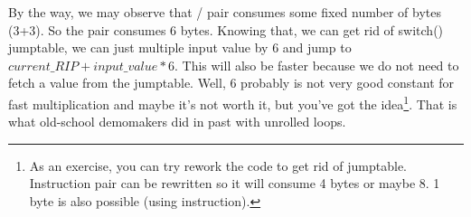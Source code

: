 By the way, we may observe that / pair consumes some fixed number of bytes (3+3).
So the pair consumes 6 bytes.
Knowing that, we can get rid of switch() jumptable, we can just multiple input value by 6
and jump to $current\_RIP + input\_value * 6$.
This will also be faster because we do not need to fetch a value from the jumptable.
Well, 6 probably is not very good constant for fast multiplication and maybe it's not worth it,
but you've got the idea\footnote{As an exercise, you can try rework the code to get rid of 
jumptable. 
Instruction pair can be rewritten so it will consume 4 bytes or maybe 8. 
1 byte is also possible (using  instruction).}.
That is what old-school demomakers did in past with unrolled loops.
\fi
